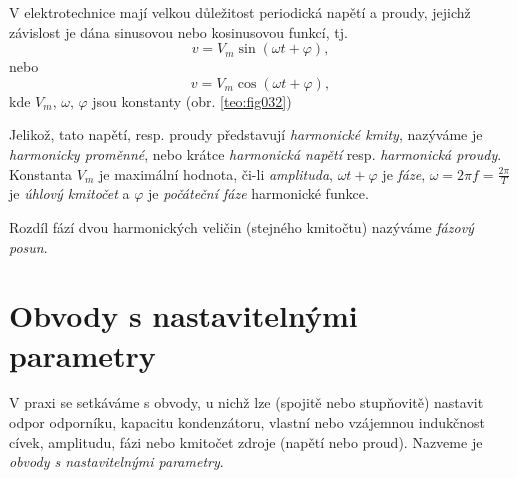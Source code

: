     V elektrotechnice mají velkou důležitost periodická napětí a proudy, jejichž závislost je dána
    sinusovou nebo kosinusovou funkcí, tj.
    \begin{equation}\label{TEO:eq_harm08}
      v = V_m\sin(\omega t + \varphi),
    \end{equation}        
    nebo
    \begin{equation}\label{TEO:eq_harm09}
      v = V_m\cos(\omega t + \varphi),
    \end{equation}  
    kde $V_m$, $\omega$, $\varphi$ jsou konstanty (obr. \ref{teo:fig032})
    
    Jelikož, tato napětí, resp. proudy představují \emph{harmonické kmity}, nazýváme je
    \emph{harmonicky proměnné}, nebo krátce \emph{harmonická napětí} resp. \emph{harmonická
    proudy}. Konstanta $V_m$ je maximální hodnota, či-li \emph{amplituda}, $\omega t + \varphi$ je
    \emph{fáze}, $\omega = 2\pi f = \frac{2\pi}{T}$ je \emph{úhlový kmitočet} a $\varphi$ je
    \emph{počáteční fáze} harmonické funkce.
    
    Rozdíl fází dvou harmonických veličin (stejného kmitočtu) nazýváme \emph{fázový posun}.
    
      
      
  \section{Obvody s nastavitelnými parametry}
    V praxi se setkáváme s obvody, u nichž lze (spojitě nebo stupňovitě) nastavit odpor odporníku, 
    kapacitu kondenzátoru, vlastní nebo vzájemnou indukčnost cívek, amplitudu, fázi nebo kmitočet
    zdroje (napětí nebo proud). Nazveme je \emph{obvody s nastavitelnými parametry}.


